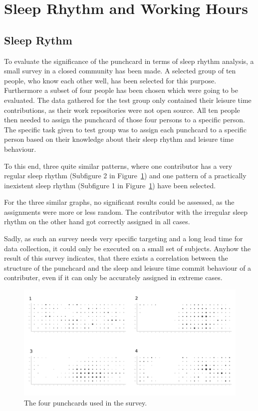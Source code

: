\section{Sleep Rhythm and Working Hours}

\subsection{Sleep Rythm}
To evaluate the significance of the punchcard in terms of sleep rhythm analysis, a small survey in a closed community has been made.
A selected group of ten people, who know each other well, has been selected for this purpose.
Furthermore a subset of four people has been chosen which were going to be evaluated.
The data gathered for the test group only contained their leisure time contributions, as their work repositories were not open source.
All ten people then needed to assign the punchcard of those four persons to a specific person.
The specific task given to test group was to assign each punchcard to a specific person based on their knowledge about their sleep rhythm and leisure time behaviour.

To this end, three quite similar patterns, where one contributor has a very regular sleep rhythm (Subfigure 2 in Figure~\ref{fig:punchcard-survey}) and one pattern of a practically inexistent sleep rhythm (Subfigure 1 in Figure~\ref{fig:punchcard-survey}) have been selected.

For the three similar graphs, no significant results could be assessed, as the assignments were more or less random.
The contributor with the irregular sleep rhythm on the other hand got correctly assigned in all cases.

Sadly, as such an survey needs very specific targeting and a long lead time for data collection, it could only be executed on a small set of subjects.
Anyhow the result of this survey indicates, that there exists a correlation between the structure of the punchcard and the sleep and leisure time commit behaviour of a contributer, even if it can only be accurately assigned in extreme cases.


\begin{figure}[H]
    \includegraphics[scale=0.16]{./graphs/analysis/survey_combined}
    \centering
    \caption{The four punchcards used in the survey.}\label{fig:punchcard-survey}
\end{figure}

